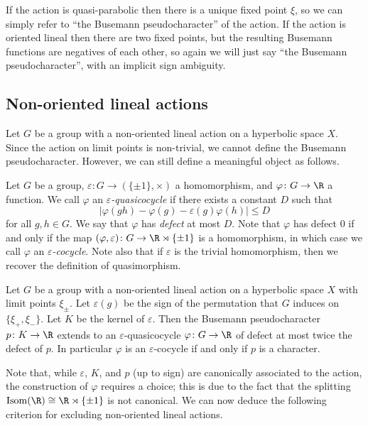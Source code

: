 If the action is quasi-parabolic then there is a unique fixed point $\xi$, so we can simply refer to ``the Busemann pseudocharacter'' of the action. If the action is oriented lineal then there are two fixed points, but the resulting Busemann functions are negatives of each other, so again we will just say ``the Busemann pseudocharacter'', with an implicit sign ambiguity.


\subsection{Non-oriented lineal actions}

Let $G$ be a group with a non-oriented lineal action on a hyperbolic space $X$. Since the action on limit points is non-trivial, we cannot define the Busemann pseudocharacter. However, we can still define a meaningful object as follows.

\begin{defi}
    Let $G$ be a group, $\varepsilon \colon G \to (\{ \pm 1 \}, \times)$ a homomorphism, and $\varphi \colon G \to \R$ a function. We call $\varphi$ an \emph{$\varepsilon$-quasicocycle} if there exists a constant $D$ such that
    \[ |\varphi(gh) - \varphi(g) - \varepsilon(g)\varphi(h)| \leq D\]
    for all $g, h \in G$. We say that $\varphi$ has \emph{defect} at most $D$. Note that $\varphi$ has defect $0$ if and only if the map $(\varphi, \varepsilon) \colon G \to \R \rtimes \{ \pm 1 \}$ is a homomorphism, in which case we call $\varphi$ an \emph{$\varepsilon$-cocycle}. Note also that if $\varepsilon$ is the trivial homomorphism, then we recover the definition of quasimorphism.
\end{defi}

\begin{cit}[{\cite[Proposition 2.10]{NL}}]
\label{cit:quasicocycle}
    Let $G$ be a group with a non-oriented lineal action on a hyperbolic space $X$ with limit points $\xi_{\pm}$. Let $\varepsilon(g)$ be the sign of the permutation that $G$ induces on $\{ \xi_+, \xi_- \}$. Let $K$ be the kernel of $\varepsilon$. Then the Busemann pseudocharacter $p \colon K \to \R$ extends to an $\varepsilon$-quasicocycle $\varphi \colon G \to \R$ of defect at most twice the defect of $p$. In particular $\varphi$ is an $\varepsilon$-cocycle if and only if $p$ is a character.
\end{cit}

Note that, while $\varepsilon$, $K$, and $p$ (up to sign) are canonically associated to the action, the construction of $\varphi$ requires a choice; this is due to the fact that the splitting $\mathrm{Isom}(\R) \cong \R \rtimes \{ \pm 1 \}$ is not canonical. We can now deduce the following criterion for excluding non-oriented lineal actions.

